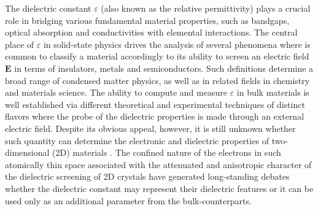 \documentclass[journal=ancac3,manuscript=article,email=true,hyperref=true,keywords=false]{achemso}
\begin{document}
The dielectric constant $\varepsilon$ (also known as the relative permittivity) 
plays a crucial role in bridging various fundamental material
properties, such as bandgaps\cite{Moss_1950_relation,Moss_1985_n_Eg}, 
optical absorption\cite{kittel_2005_introduction} and 
conductivities\cite{Dressel_2001_electrodynamics}   
with elemental interactions. 
The central place of $\varepsilon$ in solid-state physics drives the analysis of several phenomena 
where is common to classify a material accordingly to its ability to screen an 
electric field $\boldsymbol{E}$ in terms of insulators, metals and semiconductors. Such definitions determine a broad range of 
condensed matter physics, as well as in related fields in chemistry and materials science. 
The ability to compute and measure $\varepsilon$ in bulk materials is well established via different 
theoretical and experimental techniques of distinct flavors where the probe of the dielectric properties 
is made through an external electric field. 
%
Despite its obvious appeal, however, it is still unknown whether such quantity can determine the 
electronic and dielectric properties of two-dimensional (2D) materials \cite{Novoselov_2016}.  
%
The confined nature of the electrons in such atomically thin space associated with the 
attenuated and anisotropic character of the dielectric screening of 2D crystals 
\cite{Keldysh_1979_eps_multi,Sharma_1985,Low_2014_screening_BP,Cudazzo_2011_screening_2D,Bechstedt_2012,Cudazzo_2010_screen2D,Nazarov_2015_2D_3D}
have generated long-standing debates whether the dielectric constant 
may represent their dielectric features or it can be used only as an 
additional parameter from the bulk-counterparts. 
\end{document}
